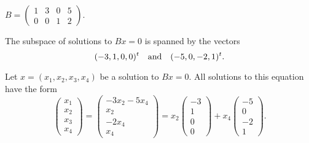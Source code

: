 \documentclass{ximera}
\begin{document}
\begin{exercise} \label{c5.2.2b}
$B = \left(\begin{array}{rrrr} 1 & 3 & 0 & 5 \\
	0 & 0 & 1 & 2 \end{array}\right)$.

\begin{solution}

\ans The subspace of solutions to $Bx = 0$ is spanned by the vectors
\[
(-3,1,0,0)^t \quad\mbox{and}\quad (-5,0,-2,1)^t.
\]

\soln Let $x = (x_1,x_2,x_3,x_4)$ be a solution to $Bx = 0$.  All
solutions to this equation have the form
\[
\left(\begin{array}{r} x_1 \\ x_2 \\ x_3 \\ x_4 \end{array}\right)
= \left(\begin{array}{c} -3x_2 - 5x_4 \\ x_2 \\ -2x_4 \\ x_4
\end{array}\right) = x_2\left(\begin{array}{r} -3 \\ 1 \\ 0 \\ 0
\end{array}\right) + x_4\left(\begin{array}{r} -5 \\ 0 \\ -2 \\ 1
\end{array}\right).
\]

\end{solution}
\end{exercise}
\end{document}
